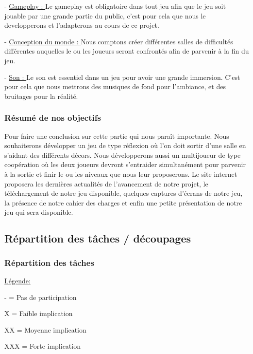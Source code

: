 \documentclass[a4paper , 12pt]{article}
\begin{document}
- \underline{Gameplay : } Le gameplay est obligatoire dans tout jeu afin que le jeu soit jouable par une grande partie du public, c’est pour cela que nous le developperons et l’adapterons au cours de ce projet.

\quad

- \underline{Conception du monde : } Nous comptons créer différentes salles de difficultés différentes auquelles le ou les joueurs seront confrontés afin de parvenir à la fin du jeu.

\quad

- \underline{Son : } Le son est essentiel dans un jeu pour avoir une grande immersion. C’est pour cela que nous mettrons des musiques de fond pour l'ambiance, et des bruitages pour la réalité.

\quad

	\subsubsection{Résumé de nos objectifs}

Pour faire une conclusion sur cette partie qui nous paraît importante. Nous souhaiterons développer un jeu de type réflexion où l'on doit sortir d'une salle en s'aidant des différents décors. Nous développerons aussi un multijoueur
de type coopération où les deux joueurs devront s'entraider simultanément pour parvenir à la sortie et finir le ou les niveaux que nous leur proposerons.
Le site internet proposera les dernières actualités de l'avancement de notre projet, le téléchargement de notre jeu disponible, quelques captures d'écrans de notre jeu, la présence de notre cahier des charges et enfin une petite présentation de notre jeu qui sera disponible.
\newpage

\subsection{Répartition des tâches / découpages}
	\subsubsection{Répartition des tâches}
\underline{Légende:} 


\quad
- = Pas de participation

 \quad
X = Faible implication

\quad
XX = Moyenne implication

\quad
XXX = Forte implication

 \quad
\end{document}
